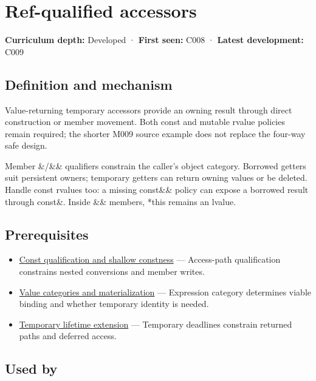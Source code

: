 \hypertarget{appendix-d42039b1d6f7}{}\label{referencestart:appendix-d42039b1d6f7}
\section{Ref-qualified accessors}\label{appendix-d42039b1d6f7-ref-qualified-accessors}

\textbf{Curriculum depth:} Developed · \textbf{First seen:} C008 · \textbf{Latest development:} C009

\subsection{Definition and mechanism}\label{appendix-d42039b1d6f7-definition-and-mechanism}

Value-returning temporary accessors provide an owning result through direct construction or member movement. Both const and mutable rvalue policies remain required; the shorter M009 source example does not replace the four-way safe design.

Member \&/\&\& qualifiers constrain the caller's object category. Borrowed getters suit persistent owners; temporary getters can return owning values or be deleted. Handle const rvalues too: a missing const\&\& policy can expose a borrowed result through const\&. Inside \&\& members, *this remains an lvalue.

\subsection{Prerequisites}\label{appendix-d42039b1d6f7-prerequisites}

\begin{itemize}
\tightlist
\item
  \hyperref[appendix-c25d60fed375]{Const qualification and shallow constness} --- Access-path qualification constrains nested conversions and member writes.
\item
  \hyperref[appendix-1121b30eaeb0]{Value categories and materialization} --- Expression category determines viable binding and whether temporary identity is needed.
\item
  \hyperref[appendix-a978b29bbbb0]{Temporary lifetime extension} --- Temporary deadlines constrain returned paths and deferred access.
\end{itemize}

\subsection{Used by}\label{appendix-d42039b1d6f7-used-by}


